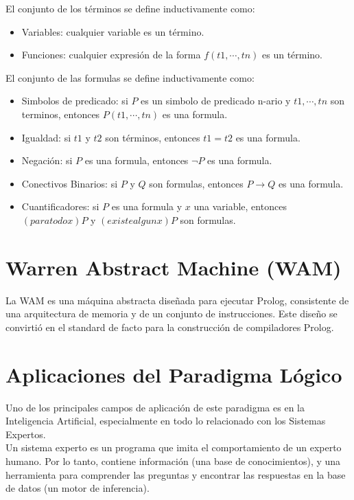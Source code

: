 \documentclass[12pt,titlepage]{report}
\begin{document}
El conjunto de los términos se define inductivamente como: \\
\begin{itemize}
    \item Variables: cualquier variable es un término.
    \item Funciones: cualquier expresión de la forma $f(t1,\cdots,tn)$ es un término.
\end{itemize}
El conjunto de las formulas se define inductivamente como: \\
\begin{itemize}
    \item Simbolos de predicado: si $P$ es un simbolo de predicado n-ario y $t1,\cdots,tn$ son terminos, entonces $P(t1,\cdots,tn)$ es una formula.
    \item Igualdad: si $t1$ y $t2$ son términos, entonces $t1=t2$ es una formula.
    \item Negación: si $P$ es una formula, entonces $¬P$ es una formula. %
    \item Conectivos Binarios: si $P$ y $Q$ son formulas, entonces $P \rightarrow Q$ es una formula. %
    \item Cuantificadores: si $P$ es una formula y $x$ una variable, entonces $(para todo x)P$ y $(existe algun x)P$ son formulas. %
\end{itemize}

\section{Warren Abstract Machine (WAM)}

La WAM es una máquina abstracta diseñada para ejecutar Prolog, consistente de una arquitectura de memoria y de un conjunto de instrucciones. Este diseño se convirtió en el standard de facto para la construcción de compiladores Prolog. \\

\section{Aplicaciones del Paradigma Lógico}

Uno de los principales campos de aplicación de este paradigma es en la Inteligencia Artificial, especialmente en todo lo relacionado con los Sistemas Expertos. \\

Un sistema experto es un programa que imita el comportamiento de un experto humano. Por lo tanto, contiene información (una base de conocimientos), y una herramienta para comprender las preguntas y encontrar las respuestas en la base de datos (un motor de inferencia). \\
\end{document}
